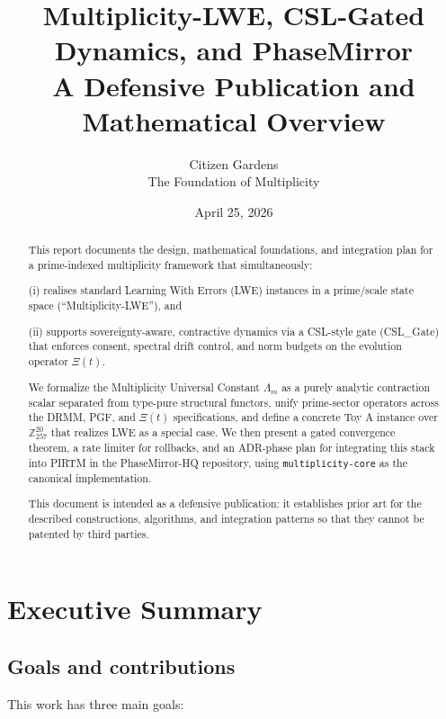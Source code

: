 \documentclass[11pt]{article}
\title{Multiplicity-LWE, CSL-Gated Dynamics, and PhaseMirror\\
\Large A Defensive Publication and Mathematical Overview}
\author{Citizen Gardens \\ The Foundation of Multiplicity}
\date{April 25, 2026}
\begin{document}
\maketitle

\begin{abstract}
This report documents the design, mathematical foundations, and integration
plan for a prime-indexed multiplicity framework that simultaneously:

(i) realises standard Learning With Errors (LWE) instances in a prime/scale
state space (``Multiplicity-LWE''), and

(ii) supports sovereignty-aware, contractive dynamics via a CSL-style gate
(CSL\_Gate) that enforces consent, spectral drift control, and norm budgets
on the evolution operator $\Xi(t)$.

We formalize the Multiplicity Universal Constant $\Lambda_m$ as a purely
analytic contraction scalar separated from type-pure structural functors,
unify prime-sector operators across the DRMM, PGF, and $\Xi(t)$ specifications,
and define a concrete Toy A instance over $\mathbb{Z}_{257}^{20}$ that realizes
LWE as a special case. We then present a gated convergence theorem, a rate
limiter for rollbacks, and an ADR-phase plan for integrating this stack into
PIRTM in the PhaseMirror-HQ repository, using \texttt{multiplicity-core}
as the canonical implementation.

This document is intended as a defensive publication: it establishes prior art
for the described constructions, algorithms, and integration patterns so
that they cannot be patented by third parties.
\end{abstract}
\newpage
\tableofcontents
\newpage
\section{Executive Summary}

\subsection{Goals and contributions}

This work has three main goals:
\end{document}
